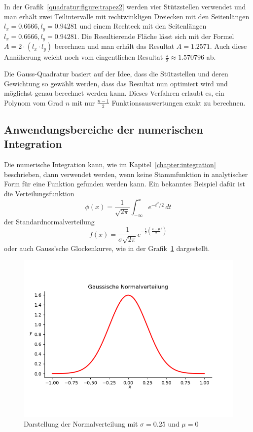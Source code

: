 \noindent
In der Grafik~\ref{quadratur:figure:trapez2} werden vier Stützstellen verwendet und man erhält zwei Teilintervalle mit 
rechtwinkligen Dreiecken mit den Seitenlängen $l_{x}=0.6666, l_{y}=0.94281$ und einem Rechteck mit den Seitenlängen
$l_{x}=0.6666, l_{y}=0.94281$. 
Die Resultierende Fläche lässt sich mit der Formel $A= 2\cdot (l_{x} \cdot l_{y})$ berechnen 
und man erhält das Resultat $A=1.2571$.
Auch diese Annäherung weicht noch vom eingentlichen Resultat $\frac{\pi}{2} \approx 1.570796$ ab.

\noindent
Die Gauss-Quadratur basiert auf der Idee, dass die Stützstellen und deren Gewichtung so gewählt werden,
dass das Resultat nun optimiert wird und möglichst genau berechnet werden kann.
Dieses Verfahren erlaubt es, ein Polynom vom Grad $n$ mit nur $\frac{n-1}{2}$
Funktionsauswertungen exakt zu berechnen.

\newpage

\subsection{Anwendungsbereiche der numerischen Integration \label{quadratur:subsection:anwendungsbereiche}}
Die numerische Integration kann, wie im Kapitel~\ref{chapter:integration} beschrieben, dann verwendet
werden, wenn keine Stammfunktion in analytischer Form für eine Funktion gefunden werden kann.
Ein bekanntes Beispiel dafür ist die Verteilungsfunktion
\begin{equation}
    \phi(x) 
    =
    \frac{1}{\sqrt{2\pi}}
    \int_{-\infty}^x e^{-t^2/2}\,dt
\end{equation}
\noindent
der Standardnormalverteilung
\begin{equation}
    f(x)
    = 
    \frac{1}{\sigma \sqrt{2\pi}}e^{-\frac{1}{2}(\frac{x-\mu}{\sigma}^{2})}
\end{equation}
\noindent 
oder auch Gauss'sche Glockenkurve, wie in der Grafik~\ref{quadratur:figure:gaussdistribution} dargestellt. 

\begin{figure}[!h]
    \centering
    \includegraphics[scale=0.6]{papers/quadratur/figures/GaussDistribution1}
    \caption{Darstellung der Normalverteilung mit $\sigma=0.25$ und $\mu=0$
    \label{quadratur:figure:gaussdistribution}}
\end{figure}

